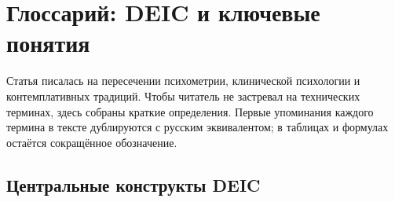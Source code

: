 \section*{Глоссарий: DEIC и ключевые понятия}
\label{sec:glossary}

Статья писалась на пересечении психометрии, клинической психологии и контемплативных традиций. Чтобы читатель не застревал на технических терминах, здесь собраны краткие определения. Первые упоминания каждого термина в тексте дублируются с русским эквивалентом; в таблицах и формулах остаётся сокращённое обозначение.

\subsection*{Центральные конструкты DEIC}

